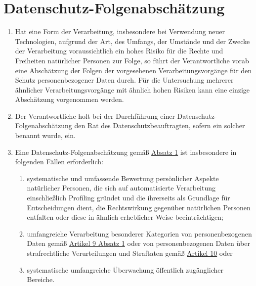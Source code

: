 \chapter{Datenschutz-Folgenabschätzung}
\label{ch:35}


\begin{enumerate}

  \item Hat eine Form der Verarbeitung, insbesondere bei Verwendung neuer Technologien, aufgrund der Art, des Umfangs,
   der Umstände und der Zwecke der Verarbeitung voraussichtlich ein hohes Risiko für die Rechte und Freiheiten
   natürlicher Personen zur Folge, so führt der Verantwortliche vorab eine Abschätzung der Folgen der vorgesehenen
   Verarbeitungsvorgänge für den Schutz personenbezogener Daten durch. Für die Untersuchung mehrerer ähnlicher
   Verarbeitungsvorgänge mit ähnlich hohen Risiken kann eine einzige Abschätzung vorgenommen werden.
  \label{itm:35-1}

  \item Der Verantwortliche holt bei der Durchführung einer Datenschutz-Folgenabschätzung den Rat des
   Datenschutzbeauftragten, sofern ein solcher benannt wurde, ein.
  \label{itm:35-2}

  \item Eine Datenschutz-Folgenabschätzung gemäß \hyperref[itm:35-1]{Absatz 1} ist insbesondere in folgenden Fällen
   erforderlich:
  \label{itm:35-3}

  \begin{enumerate}
  
    \item systematische und umfassende Bewertung persönlicher Aspekte natürlicher Personen, die sich auf automatisierte
     Verarbeitung einschließlich Profiling gründet und die ihrerseits als Grundlage für Entscheidungen dient, die
     Rechtswirkung gegenüber natürlichen Personen entfalten oder diese in ähnlich erheblicher Weise beeinträchtigen;
    \label{itm:35-3a}

    \item umfangreiche Verarbeitung besonderer Kategorien von personenbezogenen Daten gemäß \hyperref[itm:09-1]
     {Artikel 9 Absatz 1} oder von personenbezogenen Daten über strafrechtliche Verurteilungen und Straftaten
     gemäß \hyperref[ch:10]{Artikel 10} oder
    \label{itm:35-3b}

    \item systematische umfangreiche Überwachung öffentlich zugänglicher Bereiche.
    \label{itm:35-3c}


\end{enumerate}
\end{enumerate}
